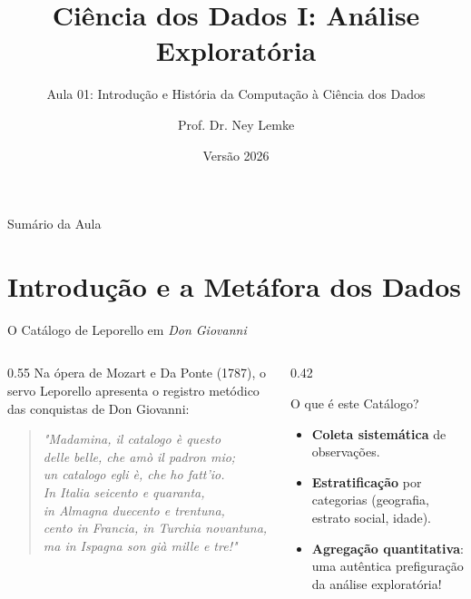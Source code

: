 \documentclass[aspectratio=169, 10pt]{beamer}
\title[Aula 01 - História e Introdução]{Ciência dos Dados I: Análise Exploratória}
\subtitle{Aula 01: Introdução e História da Computação à Ciência dos Dados}
\author{Prof. Dr. Ney Lemke}
\institute{UNESP -- Instituto de Biociências de Botucatu \\ Curso de Física Médica}
\date{Versão 2026}
\begin{document}
\frame{\titlepage}

\begin{frame}{Sumário da Aula}
  \tableofcontents
\end{frame}

\section{Introdução e a Metáfora dos Dados}

\begin{frame}{O Catálogo de Leporello em \textit{Don Giovanni}}
  \begin{columns}
    \begin{column}{0.55\textwidth}
      Na ópera de Mozart e Da Ponte (1787), o servo Leporello apresenta o registro metódico das conquistas de Don Giovanni:
      \begin{quote}
        \small
        \textit{"Madamina, il catalogo è questo \\
        delle belle, che amò il padron mio; \\
        un catalogo egli è, che ho fatt'io. \\
        In Italia seicento e quaranta, \\
        in Almagna duecento e trentuna, \\
        cento in Francia, in Turchia novantuna, \\
        ma in Ispagna son già mille e tre!"}
      \end{quote}
    \end{column}
    \begin{column}{0.42\textwidth}
      \begin{block}{O que é este Catálogo?}
        \begin{itemize}
          \item \textbf{Coleta sistemática} de observações.
          \item \textbf{Estratificação} por categorias (geografia, estrato social, idade).
          \item \textbf{Agregação quantitativa}: uma autêntica prefiguração da análise exploratória!
        \end{itemize}
      \end{block}
    \end{column}
  \end{columns}
\end{frame}
\end{document}
